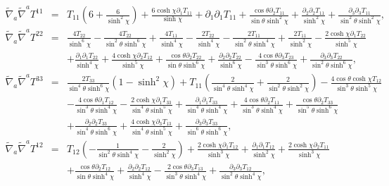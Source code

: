 \documentclass[aps,onecolumn,10pt]{revtex4}
\numberwithin{equation}{section}
\numberwithin{equation}{section}
\begin{document}
\begin{eqnarray}
\tilde{\nabla}_a\tilde{\nabla}^aT^{11}&=& T_{11} \left(6 + \frac{6}{\sinh^2\chi}\right) + \frac{6 \cosh\chi \partial_{1}T_{11}}{\sinh\chi} + \partial_{1}\partial_{1}T_{11} + \frac{\cos\theta \partial_{2}T_{11}}{\sin\theta \sinh^2\chi} + \frac{\partial_{2}\partial_{2}T_{11}}{\sinh^2\chi} + \frac{\partial_{3}\partial_{3}T_{11}}{\sin^2\theta \sinh^2\chi},
 \nonumber\\ 
\tilde{\nabla}_a\tilde{\nabla}^aT^{22}&=& \frac{4 T_{22}}{\sinh^6\chi} -  \frac{4 T_{22}}{\sin^2\theta \sinh^6\chi} + \frac{4 T_{11}}{\sinh^4\chi} -  \frac{2 T_{22}}{\sinh^4\chi} -  \frac{2 T_{11}}{\sin^2\theta \sinh^4\chi} + \frac{2 T_{11}}{\sinh^2\chi} -  \frac{2 \cosh\chi \partial_{1}T_{22}}{\sinh^5\chi} \nonumber \\ 
&& + \frac{\partial_{1}\partial_{1}T_{22}}{\sinh^4\chi} + \frac{4 \cosh\chi \partial_{2}T_{12}}{\sinh^5\chi} + \frac{\cos\theta \partial_{2}T_{22}}{\sin\theta \sinh^6\chi} + \frac{\partial_{2}\partial_{2}T_{22}}{\sinh^6\chi} -  \frac{4 \cos\theta \partial_{3}T_{23}}{\sin^3\theta \sinh^6\chi} + \frac{\partial_{3}\partial_{3}T_{22}}{\sin^2\theta \sinh^6\chi},
 \nonumber\\ 
\tilde{\nabla}_a\tilde{\nabla}^aT^{33}&=& \frac{2T_{33}} {\sin^4\theta\sinh^6\chi}\left(1-{\sinh^2\chi}\right) + T_{11} \left(\frac{2}{\sin^4\theta \sinh^4\chi} + \frac{2}{\sin^2\theta \sinh^2\chi}\right) -  \frac{4 \cos\theta \cosh\chi T_{12}}{\sin^3\theta \sinh^5\chi} 
\nonumber \\ 
&& -  \frac{4 \cos\theta \partial_{1}T_{12}}{\sin^3\theta \sinh^4\chi} -  \frac{2 \cosh\chi \partial_{1}T_{33}}{\sin^4\theta \sinh^5\chi} + \frac{\partial_{1}\partial_{1}T_{33}}{\sin^4\theta \sinh^4\chi} + \frac{4 \cos\theta \partial_{2}T_{11}}{\sin^3\theta \sinh^4\chi} + \frac{\cos\theta \partial_{2}T_{33}}{\sin^5\theta \sinh^6\chi} \nonumber \\ 
&& + \frac{\partial_{2}\partial_{2}T_{33}}{\sin^4\theta \sinh^6\chi} + \frac{4 \cosh\chi \partial_{3}T_{13}}{\sin^4\theta \sinh^5\chi} + \frac{\partial_{3}\partial_{3}T_{33}}{\sin^6\theta \sinh^6\chi},
\nonumber\\ 
\tilde{\nabla}_a\tilde{\nabla}^aT^{12}&=& T_{12} \left(- \frac{1}{\sin^2\theta \sinh^4\chi} -  \frac{2}{\sinh^2\chi}\right) + \frac{2 \cosh\chi \partial_{1}T_{12}}{\sinh^3\chi} + \frac{\partial_{1}\partial_{1}T_{12}}{\sinh^2\chi} + \frac{2 \cosh\chi \partial_{2}T_{11}}{\sinh^3\chi} \nonumber \\ 
&& + \frac{\cos\theta \partial_{2}T_{12}}{\sin\theta \sinh^4\chi} + \frac{\partial_{2}\partial_{2}T_{12}}{\sinh^4\chi} -  \frac{2 \cos\theta \partial_{3}T_{13}}{\sin^3\theta \sinh^4\chi} + \frac{\partial_{3}\partial_{3}T_{12}}{\sin^2\theta \sinh^4\chi},

\end{eqnarray}
\end{document}
